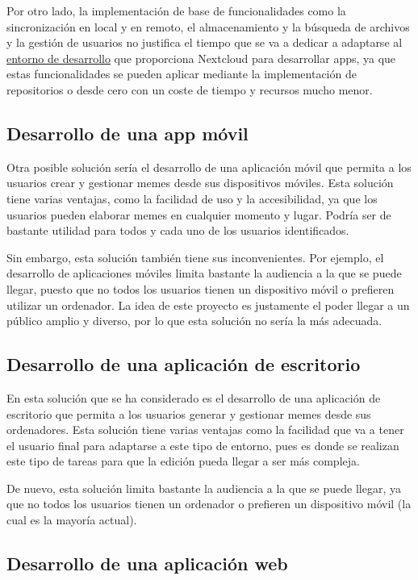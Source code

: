 Por otro lado, la implementación de base de funcionalidades como la sincronización en local y en remoto, el almacenamiento y la búsqueda de archivos y la gestión de usuarios no justifica el tiempo que se va a dedicar a adaptarse al \href{https://nextcloud.com/developer/}{entorno de desarrollo} que proporciona Nextcloud para desarrollar apps, ya que estas funcionalidades se pueden aplicar mediante la implementación de repositorios o desde cero con un coste de tiempo y recursos mucho menor.

\subsection{Desarrollo de una app móvil}

Otra posible solución sería el desarrollo de una aplicación móvil que permita a los usuarios crear y gestionar memes desde sus dispositivos móviles. Esta solución tiene varias ventajas, como la facilidad de uso y la accesibilidad, ya que los usuarios pueden elaborar memes en cualquier momento y lugar. Podría ser de bastante utilidad para todos y cada uno de los usuarios identificados.

Sin embargo, esta solución también tiene sus inconvenientes. Por ejemplo, el desarrollo de aplicaciones móviles limita bastante la audiencia a la que se puede llegar, puesto que no todos los usuarios tienen un dispositivo móvil o prefieren utilizar un ordenador. La idea de este proyecto es justamente el poder llegar a un público amplio y diverso, por lo que esta solución no sería la más adecuada.

\subsection{Desarrollo de una aplicación de escritorio}

En esta solución que se ha considerado es el desarrollo de una aplicación de escritorio que permita a los usuarios generar y gestionar memes desde sus ordenadores. Esta solución tiene varias ventajas como la facilidad que va a tener el usuario final para adaptarse a este tipo de entorno, pues es donde se realizan este tipo de tareas para que la edición pueda llegar a ser más compleja.

De nuevo, esta solución limita bastante la audiencia a la que se puede llegar, ya que no todos los usuarios tienen un ordenador o prefieren un dispositivo móvil (la cual es la mayoría actual).

\subsection{Desarrollo de una aplicación web}

